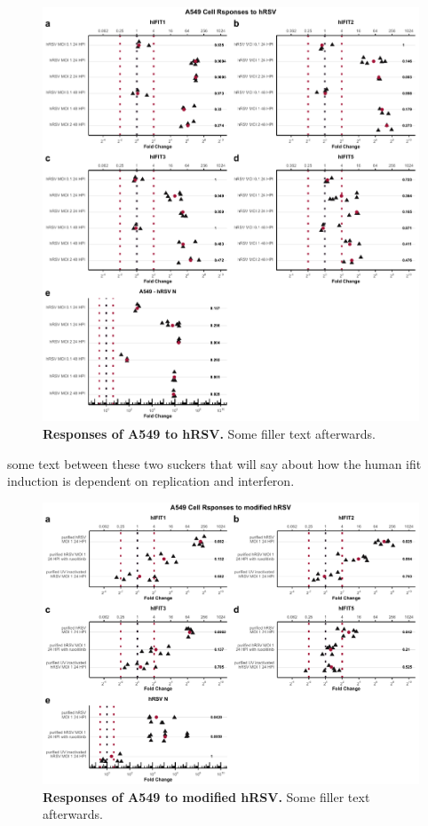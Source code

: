 \begin{figure}
    \centering
    \includegraphics[width=1\linewidth]{06. Chapter 1/Figs/01. Induction/05. a549_hrsv_timepoints.pdf}
    \caption[Responses of A549 to hRSV.]{\textbf{Responses of A549 to hRSV.} Some filler text afterwards.}
    \label{Responses of A549 to hRSV}
\end{figure}

some text between these two suckers that will say about how the human ifit induction is dependent on replication and interferon.

\begin{figure}
    \centering
    \includegraphics[width=1\linewidth]{06. Chapter 1/Figs/01. Induction/06. a549_hrsv_uv_roxo.pdf}
    \caption[Responses of A549 to modified hRSV.]{\textbf{Responses of A549 to modified hRSV.} Some filler text afterwards.}
    \label{Responses of A549 to modified hRSV.}
\end{figure}

